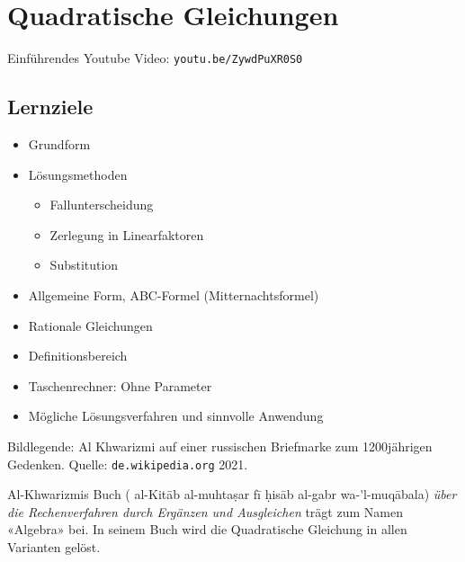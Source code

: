 \section{Quadratische Gleichungen}


Einführendes Youtube Video: \texttt{youtu.be/ZywdPuXR0S0}

\subsection*{Lernziele}

\begin{itemize}
\item Grundform
\item Lösungsmethoden
  \begin{itemize}
    \item{Fallunterscheidung}
    \item{Zerlegung in Linearfaktoren}
    \item{Substitution}
  \end{itemize}
\item Allgemeine Form, ABC-Formel (Mitternachtsformel)
\item Rationale Gleichungen
\item Definitionsbereich
\item Taschenrechner: Ohne Parameter
\item Mögliche Lösungsverfahren und sinnvolle Anwendung
\end{itemize}
\newpage

Bildlegende: Al Khwarizmi auf einer russischen Briefmarke zum
1200jährigen Gedenken. Quelle: \texttt{de.wikipedia.org} 2021.


Al-Khwarizmis Buch (
al-Kit\={a}b al-muhta\d{s}ar f\={i} \d{h}is\={a}b al-gabr wa-\'{}l-muq\={a}bala) \textit{über die Rechenverfahren durch Ergänzen und
Ausgleichen} trägt zum Namen «Algebra» bei. In seinem Buch wird die
Quadratische Gleichung in allen Varianten gelöst.

